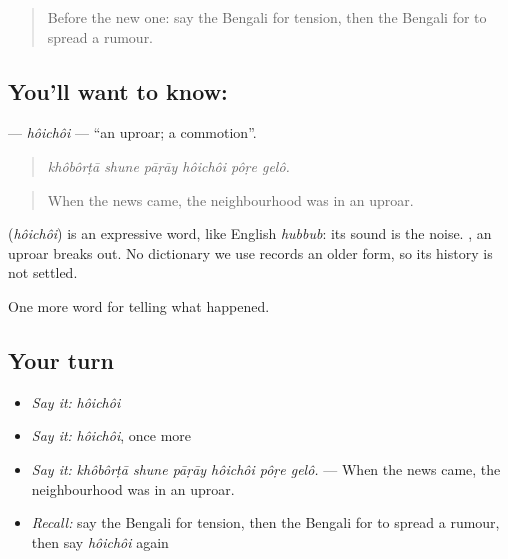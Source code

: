 \label{lesson:BN-C298-hoichoi}



\begin{quote}
Before the new one: say the Bengali for tension, then the Bengali for to spread a rumour.
\end{quote}

\subsection*{You'll want to know: }
\textbf{} — \emph{hôichôi} — \textquotedblleft{}an uproar; a commotion\textquotedblright{}.

\begin{quote}
     
\end{quote}

\begin{quote}
\emph{khôbôrṭā shune pāṛāy hôichôi pôṛe gelô.}
\end{quote}

\begin{quote}
When the news came, the neighbourhood was in an uproar.
\end{quote}

\begin{cousinweb}
\textbf{} (\emph{hôichôi}) is an expressive word, like English \emph{hubbub}: its sound is the noise.   , an uproar breaks out. No dictionary we use records an older form, so its history is not settled.
\end{cousinweb}

\begin{grammarlens}[title={What you've built}]
One more word for telling what happened.
\end{grammarlens}

\subsection*{Your turn}
\begin{itemize}
\raggedright
  \item \emph{Say it:} \emph{hôichôi}
  \item \emph{Say it:} \emph{hôichôi}, once more
  \item \emph{Say it:} \emph{khôbôrṭā shune pāṛāy hôichôi pôṛe gelô.} — When the news came, the neighbourhood was in an uproar.
  \item \emph{Recall:} say the Bengali for tension, then the Bengali for to spread a rumour, then say \emph{hôichôi} again
\end{itemize}

